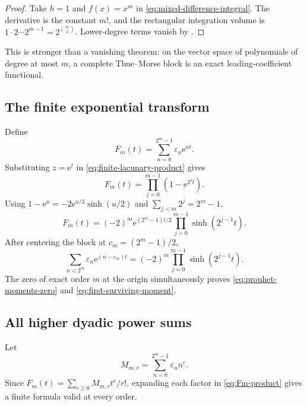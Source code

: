 \documentclass[11pt,oneside]{article}
\theoremstyle{definition}
\theoremstyle{remark}
\newcommand{\e}{\mathrm e}
\newcommand{\eps}{\varepsilon}
\begin{document}
\begin{proof}
Take \(h=1\) and \(f(x)=x^m\) in \eqref{eq:mixed-difference-integral}.  The derivative is
the constant \(m!\), and the rectangular integration volume is
\(1\cdot2\cdots2^{m-1}=2^{\binom m2}\).  Lower-degree terms vanish by
.
\end{proof}

This is stronger than a vanishing theorem: on the vector space of polynomials of degree at
most \(m\), a complete Thue--Morse block is an exact leading-coefficient functional.

\subsection{The finite exponential transform}

Define
\begin{equation}
  F_m(t)=\sum_{n=0}^{2^m-1}\eps_n\e^{nt}.                  \label{eq:Fm-exponential}
\end{equation}
Substituting \(z=\e^t\) in \eqref{eq:finite-lacunary-product} gives
\begin{equation}
  \boxed{
  F_m(t)=\prod_{j=0}^{m-1}(1-\e^{2^jt}).}                  \label{eq:Fm-product}
\end{equation}
Using \(1-\e^u=-2\e^{u/2}\sinh(u/2)\) and
\(\sum_{j<m}2^j=2^m-1\),
\begin{equation}
  F_m(t)=(-2)^m\e^{(2^m-1)t/2}
          \prod_{j=0}^{m-1}\sinh(2^{j-1}t).                \label{eq:Fm-sinh}
\end{equation}
After centering the block at \(c_m=(2^m-1)/2\),
\begin{equation}
  \boxed{
  \sum_{n<2^m}\eps_n\e^{(n-c_m)t}
   =(-2)^m\prod_{j=0}^{m-1}\sinh(2^{j-1}t).}               \label{eq:centered-exponential}
\end{equation}
The zero of exact order \(m\) at the origin simultaneously proves
\eqref{eq:prouhet-moments-zero} and \eqref{eq:first-surviving-moment}.

\subsection{All higher dyadic power sums}

Let
\begin{equation}
  M_{m,r}=\sum_{n=0}^{2^m-1}\eps_nn^r.                      \label{eq:Mmr-def}
\end{equation}
Since \(F_m(t)=\sum_{r\ge0}M_{m,r}t^r/r!\), expanding each factor in
\eqref{eq:Fm-product} gives a finite formula valid at every order.
\end{document}
